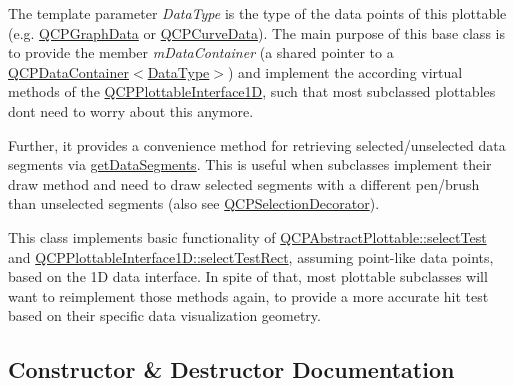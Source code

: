 The template parameter {\itshape Data\+Type} is the type of the data points of this plottable (e.\+g. \mbox{\hyperlink{class_q_c_p_graph_data}{Q\+C\+P\+Graph\+Data}} or \mbox{\hyperlink{class_q_c_p_curve_data}{Q\+C\+P\+Curve\+Data}}). The main purpose of this base class is to provide the member {\itshape m\+Data\+Container} (a shared pointer to a \mbox{\hyperlink{class_q_c_p_data_container}{Q\+C\+P\+Data\+Container$<$Data\+Type$>$}}) and implement the according virtual methods of the \mbox{\hyperlink{class_q_c_p_plottable_interface1_d}{Q\+C\+P\+Plottable\+Interface1D}}, such that most subclassed plottables don\textquotesingle{}t need to worry about this anymore.

Further, it provides a convenience method for retrieving selected/unselected data segments via \mbox{\hyperlink{class_q_c_p_abstract_plottable1_d_ae890e62ce403c54f575c73b9529f1af8}{get\+Data\+Segments}}. This is useful when subclasses implement their draw method and need to draw selected segments with a different pen/brush than unselected segments (also see \mbox{\hyperlink{class_q_c_p_selection_decorator}{Q\+C\+P\+Selection\+Decorator}}).

This class implements basic functionality of \mbox{\hyperlink{class_q_c_p_abstract_plottable_a38efe9641d972992a3d44204bc80ec1d}{Q\+C\+P\+Abstract\+Plottable\+::select\+Test}} and \mbox{\hyperlink{class_q_c_p_plottable_interface1_d_a67093e4ccf490ff5f7750640941ff34c}{Q\+C\+P\+Plottable\+Interface1\+D\+::select\+Test\+Rect}}, assuming point-\/like data points, based on the 1D data interface. In spite of that, most plottable subclasses will want to reimplement those methods again, to provide a more accurate hit test based on their specific data visualization geometry. 

\subsection{Constructor \& Destructor Documentation}
\mbox{\label{class_q_c_p_abstract_plottable1_d_a30b2e50ab0afce65f104ea7a95440315}} 
